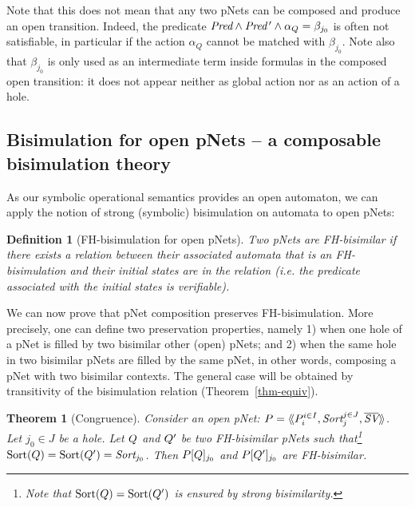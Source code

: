 \documentclass{lmcs}
\newcommand{\TODO}[1]{\textcolor{red}{\textbf{[TODO:#1]}}}
\newtheorem{theorem}{Theorem}
\newtheorem{definition}{Definition}
\begin{document}
Note that this does not mean that any two pNets can be composed and produce an open 
transition. Indeed, the predicate $\Pred\land\Pred\,'\land \alpha_Q=\beta_{j_0}$ is often not  satisfiable, in particular if the action  $\alpha_Q$ cannot be matched with $\beta_{j_0}$.
Note also that $\beta_{j_0}$ is  only used as an intermediate term inside formulas in the composed open transition: it 
does not appear neither as global action nor as an action of a hole.


\subsection{Bisimulation for open pNets -- a composable bisimulation theory}
\label{section:bisimulation-PN}
As  our symbolic operational semantics provides an open automaton, we can apply the notion of
	strong (symbolic) bisimulation on automata to open pNets:
\begin{definition}[FH-bisimulation for open pNets]\label{def:bisim-pnets}
Two pNets are FH-bisimilar if there exists a relation between their associated 
automata that is an FH-bisimulation and their initial states are in the relation (i.e. the predicate associated with the initial states is verifiable).
\end{definition}

We can now prove that pNet composition  preserves
FH-bisimulation. More precisely, one can define two preservation
properties, namely 1) when one hole of a pNet is filled by two bisimilar other (open) pNets; and 2) when the same hole in two bisimilar pNets are
filled by the same pNet, in other words, composing a pNet with two
bisimilar contexts. The general case will be obtained by
transitivity of the bisimulation relation (Theorem~\ref{thm-equiv}). 

\begin{theorem}[Congruence]\label{thm-congr-eq}
	Consider an open pNet:
	$\pNet = \mylangle \pNet_i^{i\in I}, \Sort_j^{j\in J}, 
	\set{\symb{SV}}\myrangle$.
	Let $j_0\in J$ be a hole. Let $Q$ and $Q'$ be two FH-bisimilar pNets such that\footnote{Note that $\operatorname{Sort}(Q)=\operatorname{Sort}(Q')$ is 
	ensured by 
	strong bisimilarity.} 
	$\Sortop(\pNetQ)=\Sortop(\pNetQ')=\Sort_{j_0}$. Then 
	$P[Q]_{j_0}$ and 
	$P[Q']_{j_0}$ are FH-bisimilar.
\end{theorem}
 
\end{document}
